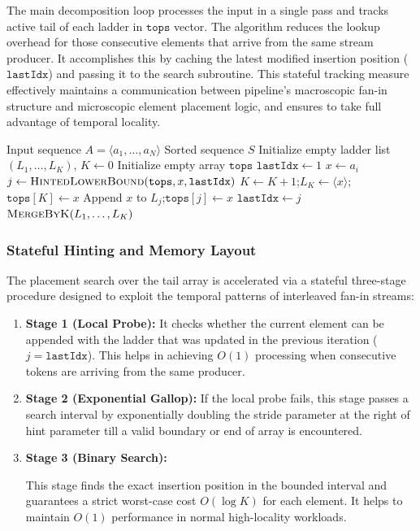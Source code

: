 \documentclass{ieeeaccess}
\theoremstyle{plain}
\theoremstyle{definition}
\newcommand{\tops}{\texttt{tops}}
\newcommand{\lastIdx}{\texttt{lastIdx}}
\begin{document}
The main decomposition loop processes the input in a single pass and tracks active tail of each ladder in $\tops$ vector. The algorithm reduces the lookup overhead for those consecutive elements that arrive from the same stream producer. It accomplishes this by caching the latest modified insertion position ($\lastIdx$) and passing it to the search subroutine. This stateful tracking measure effectively maintains a communication between pipeline's macroscopic fan-in structure and microscopic element placement logic, and ensures to take full advantage of temporal locality.

\begin{algorithm}[t]
\caption{\textsc{LadderSort}$(A)$}
\label{alg:laddersort}
\begin{algorithmic}[1]
\Require Input sequence $A = \langle a_1, \dots, a_N \rangle$
\Ensure Sorted sequence $S$
\State Initialize empty ladder list $(L_1,\dots,L_K)$, $K \gets 0$
\State Initialize empty array $\tops$
\State $\lastIdx \gets 1$
    \State $x \gets a_i$
    \State $j \gets \textsc{HintedLowerBound}(\tops, x, \lastIdx)$
        \State $K \gets K + 1$;\quad $L_K \gets \langle x \rangle$;\quad $\tops[K] \gets x$
    \Else
        \State Append $x$ to $L_j$;\quad $\tops[j] \gets x$
    \EndIf
    \State $\lastIdx \gets j$
\EndFor
\State \Return $\textsc{MergeByK}(L_1, \dots, L_K)$
\end{algorithmic}
\end{algorithm}

\subsubsection{Stateful Hinting and Memory Layout}
The placement search over the tail array is accelerated via a stateful three-stage procedure designed to exploit the temporal patterns of interleaved fan-in streams:
\begin{enumerate}
  
\item \textbf{Stage 1 (Local Probe):} It checks whether the current element can be appended with the ladder that was updated in the previous iteration ($j = \lastIdx$). This helps in achieving $O(1)$ processing when consecutive tokens are arriving from the same producer.

\item \textbf{Stage 2 (Exponential Gallop):} If the local probe fails, this stage passes a search interval by exponentially doubling the stride parameter at the right of hint parameter till a valid boundary or end of array is encountered.

\item \textbf{Stage 3 (Binary Search):} 

This stage finds the exact insertion position in the bounded interval and guarantees a strict worst-case cost $O(\log K)$ for each element. It helps to maintain $O(1)$ performance in normal high-locality workloads.

\end{enumerate}
\end{document}
